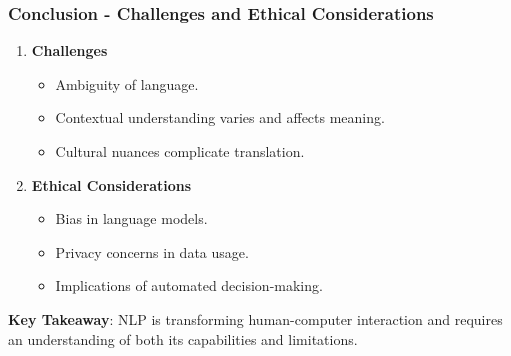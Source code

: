 \documentclass[aspectratio=169]{beamer}
\begin{document}
\begin{frame}[fragile]
    \frametitle{Conclusion - Challenges and Ethical Considerations}
    \begin{enumerate}
        \item \textbf{Challenges}
            \begin{itemize}
                \item Ambiguity of language.
                \item Contextual understanding varies and affects meaning.
                \item Cultural nuances complicate translation.
            \end{itemize}
        
        \item \textbf{Ethical Considerations}
            \begin{itemize}
                \item Bias in language models.
                \item Privacy concerns in data usage.
                \item Implications of automated decision-making.
            \end{itemize}
    \end{enumerate}
    
    \textbf{Key Takeaway}: NLP is transforming human-computer interaction and requires an understanding of both its capabilities and limitations.
\end{frame}
\end{document}
